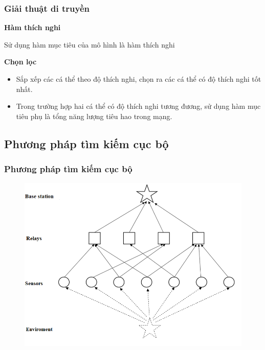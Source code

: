 \begin{frame}
    \frametitle{Giải thuật di truyền}
    
    \textbf{Hàm thích nghi}

    Sử dụng hàm mục tiêu của mô hình là hàm thích nghi 

    \vspace{1cm}
    
    \textbf{Chọn lọc}

    \begin{itemize}
        \item Sắp xếp các cá thể theo độ thích nghi, chọn ra các cá thể có độ thích nghi tốt nhất.
        \item Trong trường hợp hai cá thể có độ thích nghi tương đương, sử dụng hàm mục tiêu phụ là tổng năng lượng tiêu hao trong mạng.
    \end{itemize}
   
\end{frame}

\subsection{Phương pháp tìm kiếm cục bộ}
\begin{frame}
    \frametitle{Phương pháp tìm kiếm cục bộ}

    \begin{figure}[h]
        \centering
        \includegraphics[width=0.9\linewidth]{picture/lite_flow.png}
    \end{figure}
\end{frame}

